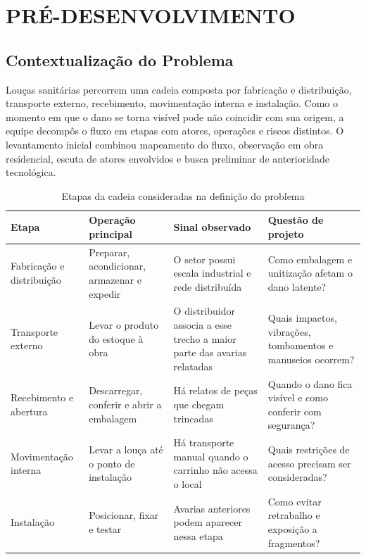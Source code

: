 \clearpage
\section{PRÉ-DESENVOLVIMENTO}

\subsection{Contextualização do Problema}

Louças sanitárias percorrem uma cadeia composta por fabricação e distribuição, transporte externo, recebimento, movimentação interna e instalação. Como o momento em que o dano se torna visível pode não coincidir com sua origem, a equipe decompôs o fluxo em etapas com atores, operações e riscos distintos. O levantamento inicial combinou mapeamento do fluxo, observação em obra residencial, escuta de atores envolvidos e busca preliminar de anterioridade tecnológica.

\begin{table}[H]
\caption{Etapas da cadeia consideradas na definição do problema}
\label{tab:cadeia}
\centering
\footnotesize
\begin{tabularx}{\textwidth}{L{2.7cm}YYL{2.6cm}}
\toprule
\textbf{Etapa} & \textbf{Operação principal} & \textbf{Sinal observado} & \textbf{Questão de projeto} \\
\midrule
Fabricação e distribuição & Preparar, acondicionar, armazenar e expedir & O setor possui escala industrial e rede distribuída & Como embalagem e unitização afetam o dano latente? \\
Transporte externo & Levar o produto do estoque à obra & O distribuidor associa a esse trecho a maior parte das avarias relatadas & Quais impactos, vibrações, tombamentos e manuseios ocorrem? \\
Recebimento e abertura & Descarregar, conferir e abrir a embalagem & Há relatos de peças que chegam trincadas & Quando o dano fica visível e como conferir com segurança? \\
Movimentação interna & Levar a louça até o ponto de instalação & Há transporte manual quando o carrinho não acessa o local & Quais restrições de acesso precisam ser consideradas? \\
Instalação & Posicionar, fixar e testar & Avarias anteriores podem aparecer nessa etapa & Como evitar retrabalho e exposição a fragmentos? \\
\bottomrule
\end{tabularx}
\end{table}


